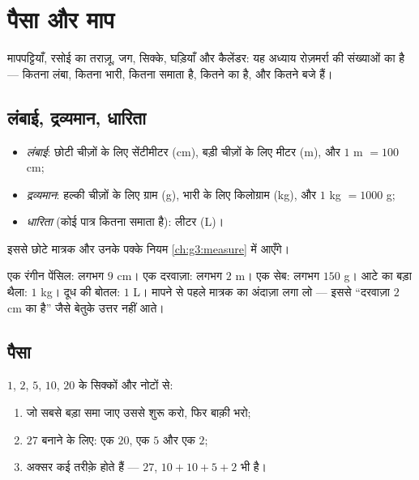 \chapter{पैसा और माप}\label{ch:g2:measure}

मापपट्टियाँ, रसोई का तराज़ू, जग, सिक्के, घड़ियाँ और कैलेंडर:
यह अध्याय रोज़मर्रा की संख्याओं का है --- कितना लंबा, कितना
भारी, कितना समाता है, कितने का है, और कितने बजे
हैं।

\section{लंबाई, द्रव्यमान, धारिता}

\begin{definition}[रोज़ के मात्रक]\label{def:g2:measure:units}
\begin{itemize}
  \item \emph{लंबाई}: छोटी चीज़ों के लिए सेंटीमीटर (cm), बड़ी
        चीज़ों के लिए मीटर (m), और $1$ m $= 100$ cm;
  \item \emph{द्रव्यमान}: हल्की चीज़ों के लिए ग्राम (g), भारी
        के लिए किलोग्राम (kg), और $1$ kg $= 1000$ g;
  \item \emph{धारिता} (कोई पात्र कितना समाता है): लीटर (L)।
\end{itemize}
इससे छोटे मात्रक और उनके पक्के नियम \cref{ch:g3:measure} में आएँगे।
\end{definition}

\begin{example}[कौन-सा मात्रक?]\label{ex:g2:measure:choose}
एक रंगीन पेंसिल: लगभग $9$ cm। एक दरवाज़ा: लगभग $2$ m। एक सेब:
लगभग $150$ g। आटे का बड़ा थैला: $1$ kg। दूध की बोतल: $1$ L।
मापने से पहले मात्रक का अंदाज़ा लगा लो --- इससे ``दरवाज़ा $2$
cm का है'' जैसे बेतुके उत्तर नहीं आते।
\end{example}

\section{पैसा}

\begin{method}[रक़म बनाना]\label{met:g2:measure:money}
$1$, $2$, $5$, $10$, $20$ के सिक्कों और नोटों से:
\begin{enumerate}
  \item जो सबसे बड़ा समा जाए उससे शुरू करो, फिर बाक़ी भरो;
  \item $27$ बनाने के लिए: एक $20$, एक $5$ और एक $2$;
  \item अक्सर कई तरीक़े होते हैं --- $27$, $10 + 10 + 5 +
        2$ भी है।
\end{enumerate}
\end{method}


